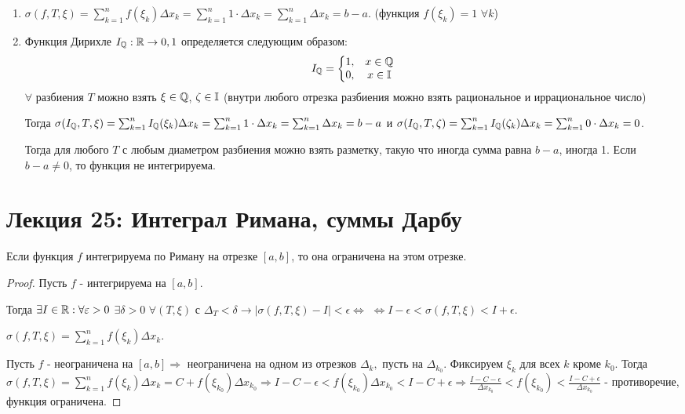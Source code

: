 	\begin{explanation}
		\begin{enumerate}
			\item $\sigma(f, T, \xi) = \sum^{n}_{k = 1} f(\xi_k) \Delta x_k = \sum^{n}_{k = 1} 1 \cdot \Delta x_k = \sum^{n}_{k = 1} \Delta x_k = b - a.$ (функция $f(\xi_k) = 1$ $\forall k$)
			
			\item Функция Дирихле $I_{\mathbb Q} : \mathbb R \rightarrow {0, 1}$ определяется следующим образом:
			\[\displaystyle I_{\mathbb Q} = \left\{{
				\begin{matrix}
					1, & x \in \mathbb Q \\
					0, & x \in \mathbb I
				\end{matrix}
			}\right.\]
			$\forall$ разбиения $T$ можно взять $\xi \in \mathbb Q$, $\zeta \in \mathbb I$ (внутри любого отрезка разбиения можно взять рациональное и иррациональное число)
			
			Тогда $\sigma(I_{\mathbb Q}, T, \xi) = \sum^{n}_{k = 1} I_{\mathbb Q}(\xi_k) \Delta x_k = \sum^{n}_{k = 1} 1 \cdot \Delta x_k = \sum^{n}_{k = 1} \Delta x_k = b - a$ и $\sigma(I_{\mathbb Q}, T, \zeta) = \sum^{n}_{k = 1} I_{\mathbb Q}(\zeta_k) \Delta x_k = \sum^{n}_{k = 1} 0 \cdot \Delta x_k = 0$.
			
			Тогда для любого $T$ с любым диаметром разбиения можно взять разметку, такую что иногда сумма равна $b - a$, иногда 1. Если $b - a \neq 0$, то функция не интегрируема.
		\end{enumerate}	
	\end{explanation}
	
	\newpage
    
    \section{Лекция 25: Интеграл Римана, суммы Дарбу}
    
    \begin{sentence}
    	Если функция $f$ интегрируема по Риману на отрезке $[a, b]$, то она ограничена на этом отрезке.
    \end{sentence}
    
    \begin{proof}
    	Пусть $f$ - интегрируема на $[a, b]$. 
    	
    	Тогда $\exists I \in \mathbb R : \forall \varepsilon > 0$ $\exists \delta > 0$  $\forall (T, \xi)$ с $\Delta_T < \delta \rightarrow |\sigma(f, T, \xi) - I| < \epsilon \Leftrightarrow$ $\Leftrightarrow I - \epsilon < \sigma(f, T, \xi) < I + \epsilon$.
    	
    	$\sigma(f, T, \xi) = \sum^{n}_{k = 1} f(\xi_k) \Delta x_k.$
    	
    	Пусть $f$ - неограничена на $[a, b] \Rightarrow$ неограничена на одном из отрезков $\Delta_k,$ пусть на $\Delta_{k_0}$. Фиксируем $\xi_k$ для всех $k$ кроме $k_0$. Тогда $\sigma(f, T, \xi) = \sum^{n}_{k = 1} f(\xi_k) \Delta x_k = C + f(\xi_{k_0}) \Delta x_{k_0} \Rightarrow I - C - \epsilon < f(\xi_{k_0}) \Delta x_{k_0} < I - C + \epsilon \Rightarrow \frac{I - C - \epsilon}{\Delta x_{k_0}} < f(\xi_{k_0}) < \frac{I - C + \epsilon}{\Delta x_{k_0}}$ - противоречие, функция ограничена.
    \end{proof}
    
